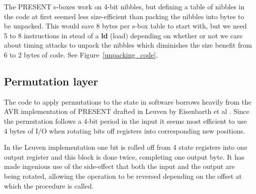 \documentclass{llncs}
\begin{document}
The PRESENT s-boxes work on 4-bit nibbles, but defining a table of nibbles in the code at first seemed less size-efficient than packing the nibbles into bytes to be unpacked.
This would save 8 bytes per s-box table to start with, but we need 5 to 8 instructions in stead of a \textbf{ld} (load) depending on whether or not we care about timing attacks to unpack the nibbles which diminishes the size benefit from 6 to 2 bytes of code. See Figure~\ref{unpacking_code}.



\subsection{Permutation layer}
The code to apply permutations to the state in software borrows heavily from the AVR implementation of PRESENT drafted in Leuven by Eisenbarth et al \cite{eisenbarth2012compact}.
Since the permutation follows a 4-bit period in the input it seems most efficient to use 4 bytes of I/O when rotating bits off registers into corresponding new positions.

In the Leuven implementation one bit is rolled off from 4 state registers into one output register and this block is done twice, completing one output byte. It has made ingenious use of the side-effect that both the input and the output are being rotated, allowing the operation to be reversed depending on the offset at which the procedure is called.
\end{document}
